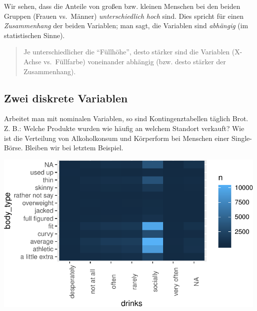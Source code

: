 \documentclass[12pt,ngerman,paper=a4,pagesize,DIV=13]{scrreprt}
\newenvironment{Shaded}{\begin{snugshade}}{\end{snugshade}}
\newcommand{\DataTypeTok}[1]{\textcolor[rgb]{0.13,0.29,0.53}{#1}}
\newcommand{\DecValTok}[1]{\textcolor[rgb]{0.00,0.00,0.81}{#1}}
\newcommand{\KeywordTok}[1]{\textcolor[rgb]{0.13,0.29,0.53}{\textbf{#1}}}
\newcommand{\NormalTok}[1]{#1}
\newcommand{\OperatorTok}[1]{\textcolor[rgb]{0.81,0.36,0.00}{\textbf{#1}}}
\newcommand{\StringTok}[1]{\textcolor[rgb]{0.31,0.60,0.02}{#1}}
\begin{document}
Wir sehen, dass die Anteile von großen bzw. kleinen Menschen bei den
beiden Gruppen (Frauen vs.~Männer) \emph{unterschiedlich hoch} sind.
Dies spricht für einen \emph{Zusammenhang} der beiden Variablen; man
sagt, die Variablen sind \emph{abhängig} (im statistischen Sinne).

\begin{quote}
Je unterschiedlicher die \enquote{Füllhöhe}, desto stärker sind die
Variablen (X-Achse vs.~Füllfarbe) voneinander abhängig (bzw. desto
stärker der Zusammenhang).
\end{quote}

\hypertarget{zwei-diskrete-variablen}{%
\subsection{Zwei diskrete Variablen}\label{zwei-diskrete-variablen}}

Arbeitet man mit nominalen Variablen, so sind Kontingenztabellen täglich
Brot. Z. B.: Welche Produkte wurden wie häufig an welchem Standort
verkauft? Wie ist die Verteilung von Alkoholkonsum und Körperform bei
Menschen einer Single-Börse. Bleiben wir bei letztem Beispiel.

\begin{Shaded}
\end{Shaded}

\includegraphics{DatenerhebungStatistik-Uebung_files/figure-latex/unnamed-chunk-254-1.pdf}
\end{document}

